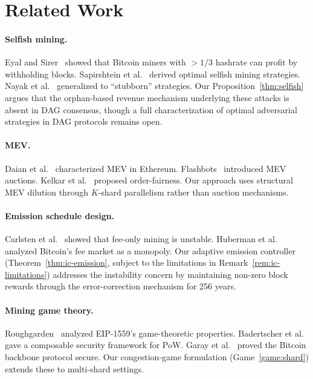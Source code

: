 \documentclass[11pt,a4paper]{article}
\theoremstyle{definition}
\theoremstyle{remark}
\begin{document}
\section{Related Work}\label{sec:related}

\paragraph{Selfish mining.}
Eyal and Sirer~\cite{eyal2014selfish} showed that Bitcoin miners with
$> 1/3$ hashrate can profit by withholding blocks.
Sapirshtein et al.~\cite{sapirshtein2016optimal} derived optimal selfish
mining strategies.
Nayak et al.~\cite{nayak2016stubborn} generalized to ``stubborn'' strategies.
Our Proposition~\ref{thm:selfish} argues that the orphan-based
revenue mechanism underlying these attacks is absent in DAG consensus,
though a full characterization of optimal adversarial strategies in DAG
protocols remains open.

\paragraph{MEV.}
Daian et al.~\cite{daian2020flashboys} characterized MEV in Ethereum.
Flashbots~\cite{flashbots2021} introduced MEV auctions.
Kelkar et al.~\cite{kelkar2020order} proposed order-fairness.
Our approach uses structural MEV dilution through $K$-shard parallelism
rather than auction mechanisms.

\paragraph{Emission schedule design.}
Carlsten et al.~\cite{carlsten2016instability} showed that fee-only
mining is unstable.
Huberman et al.~\cite{huberman2021monopoly} analyzed Bitcoin's fee market
as a monopoly.
Our adaptive emission controller (Theorem~\ref{thm:ic-emission},
subject to the limitations in Remark~\ref{rem:ic-limitations})
addresses the instability concern by maintaining non-zero block rewards
through the error-correction mechanism for 256 years.

\paragraph{Mining game theory.}
Roughgarden~\cite{roughgarden2021transaction} analyzed EIP-1559's
game-theoretic properties.
Badertscher et al.~\cite{badertscher2018composable} gave a composable
security framework for PoW.
Garay et al.~\cite{garay2015backbone} proved the Bitcoin backbone protocol
secure.
Our congestion-game formulation (Game~\ref{game:shard}) extends these
to multi-shard settings.
\end{document}

